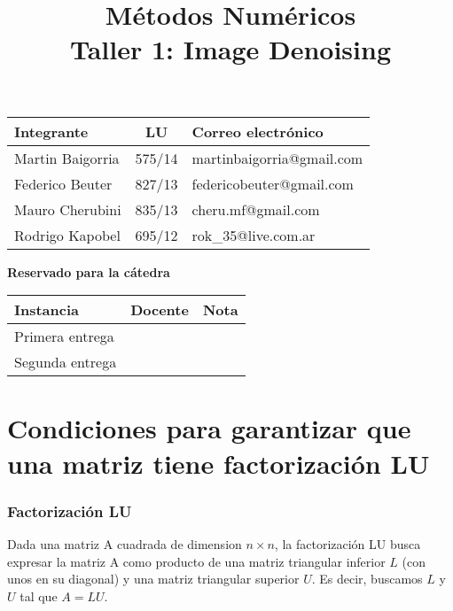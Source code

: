 \documentclass[10pt,a4paper]{article}
\title{Métodos Numéricos \\ Taller 1: Image Denoising}
\begin{document}

\maketitle

\bigskip

\begin{table}[h]
\centering
\begin{tabular}{|l l l|}
\hline
Integrante       & \multicolumn{1}{c}{LU}     & Correo electrónico        \\ \hline
Martin Baigorria & \multicolumn{1}{c}{575/14} & martinbaigorria@gmail.com \\ 
Federico Beuter & 827/13                      & federicobeuter@gmail.com \\
Mauro Cherubini & 835/13                      & cheru.mf@gmail.com \\ 
Rodrigo Kapobel & 695/12                      & rok\_35@live.com.ar \\  \hline
\end{tabular}
\end{table}

\vfill

\begin{center}
\textbf{Reservado para la cátedra}
\end{center}
\begin{table}[h]
\centering
\begin{tabular}{|l|l|l|}
\hline
Instancia       & Docente & Nota \\ \hline
Primera entrega &         &      \\ \hline
Segunda entrega &         &      \\ \hline
\end{tabular}
\end{table}

\newpage
\tableofcontents
\newpage


\section{Condiciones para garantizar que una matriz tiene factorización LU}

\subsubsection{Factorización LU}

Dada una matriz A cuadrada de dimension $n \times n$, la factorización LU busca expresar la matriz A como producto de una matriz triangular inferior $L$ (con unos en su diagonal) y una matriz triangular superior $U$. Es decir, buscamos $L$ y $U$ tal que $A = LU$.
\end{document}
